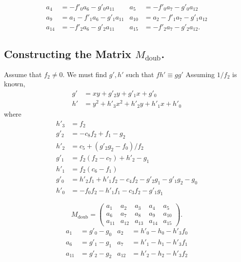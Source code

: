 \begin{align*}
  a_4    &=     - f'_0a_6 - g'_0a_{11} & a_5    &=     - f'_0a_7 - g'_0a_{12} \\
  a_9    &= a_1 - f'_1a_6 - g'_1a_{11} & a_{10} &= a_2 - f'_1a_7 - g'_1a_{12} \\
  a_{14} &=     - f'_2a_6 - g'_2a_{11} & a_{15} &=     - f'_2a_7 - g'_2a_{12}.
\end{align*}




\subsection{Constructing the Matrix $M_{\text{doub}}$.}

Assume that $f_2 \neq 0$.
We must find $g', h'$ such that $fh' \equiv gg'$
Assuming $1/f_2$ is known,
\begin{align*}
  g' &= xy            + g'_2y + g'_1x + g'_0 \\
  h' &= y^2 + h'_3x^2 + h'_2y + h'_1x + h'_0
\end{align*}
where
\begin{align*}
  h'_3 &= f_2 \\
  g'_2 &= - c_8f_2 + f_1 - g_2 \\
  h'_2 &= c_5 + (g'_2g_2 - f_0)/f_2 \\ 
  g'_1 &= f_2(f_2 - c_7) + h'_2 - g_1 \\
  h'_1 &= f_2(c_6 - f_1) \\
  g'_0 &= h'_2f_1 + h'_1f_2 - c_4f_2 - g'_2g_1 - g'_1g_2 - g_0 \\
  h'_0 &= -f_0f_2 - h'_1f_1 - c_3f_2 - g'_1g_1
\end{align*}

\[ M_{\text{doub}} =
\begin{pmatrix}
  a_1 & a_2 & a_3 & a_4 & a_5 \\
  a_6 & a_7 & a_8 & a_9 & a_{10} \\
  a_{11} & a_{12} & a_{13} & a_{14} & a_{15}
\end{pmatrix}. \]
\begin{align*}
  a_1    &= g'_0 - g_0 & a_2    &= h'_0 - h_0 - h'_3f_0 \\
  a_6    &= g'_1 - g_1 & a_7    &= h'_1 - h_1 - h'_3f_1 \\
  a_{11} &= g'_2 - g_2 & a_{12} &= h'_2 - h_2 - h'_3f_2 \\
\end{align*}

